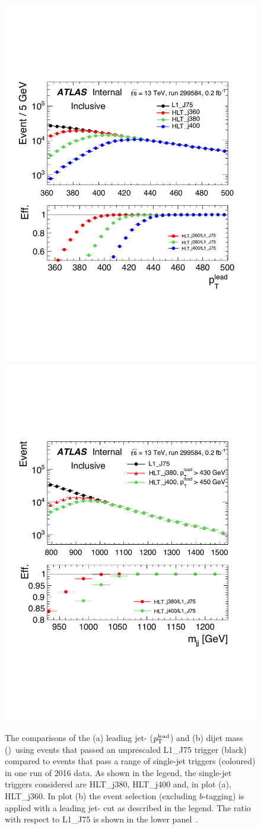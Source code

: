 \begin{figure}[!ht]
  \begin{center}
    \captionsetup[subfigure]{aboveskip=0pt,justification=centering}
    \hspace{-2mm}
     {\includegraphics[width=0.47\linewidth, angle=0]{figs/Dibjet/ICHEP/evt-jet_pt.pdf}}
    \subcaptionbox{\mjj}              {\includegraphics[width=0.46\linewidth, angle=0]{figs/Dibjet/ICHEP/evt-mjj.pdf}}
  \end{center}
  \vspace{-1em}
  \caption[Derivations of the leading jet-\pT{} and \mjj{} cuts for the \summer{} data-set event selection using events that pass an
            unprescaled L1\_J75 trigger compared to events that pass a range of single-jet triggers in one run of 2016 data.]
          {The comparisons of the (a) leading jet-\pT{} ($p_{\mathrm{T}}^{\text{lead}}$) and (b) dijet mass (\mjj{})~using events that passed an
            unprescaled L1\_J75 trigger (black) compared to events that pass a range of single-jet triggers (coloured) in one run of 2016 data.
            As shown in the legend, the single-jet triggers considered are HLT\_j380, HLT\_j400 and, in plot (a), HLT\_j360.
            In plot (b) the \summer{} event selection (excluding $b$-tagging) is applied with a leading jet-\pT{} cut as described in the legend.
            The ratio with respect to L1\_J75 is shown in the lower panel~\cite{dibjet-ichep_conf}.}
     \label{fig:evt-ICHEP_turnon}
\end{figure}


